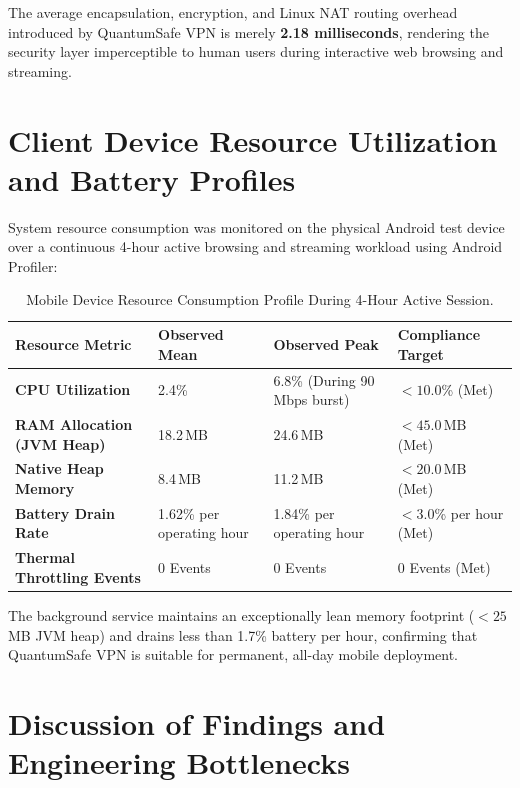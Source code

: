 The average encapsulation, encryption, and Linux NAT routing overhead introduced by QuantumSafe VPN is merely \textbf{2.18 milliseconds}, rendering the security layer imperceptible to human users during interactive web browsing and streaming.

\section{Client Device Resource Utilization and Battery Profiles}
\label{sec:resource_utilization_results}

System resource consumption was monitored on the physical Android test device over a continuous 4-hour active browsing and streaming workload using Android Profiler:

\begin{table}[htbp]
  \centering
  \small
  \caption{Mobile Device Resource Consumption Profile During 4-Hour Active Session.}
  \label{tab:mobile_resource_profile}
  \begin{tabular}{@{}P{4.2cm}P{3.4cm}P{3.4cm}P{3.0cm}@{}}
    \toprule
    \textbf{Resource Metric} & \textbf{Observed Mean} & \textbf{Observed Peak} & \textbf{Compliance Target} \\
    \midrule
    \textbf{CPU Utilization} & 2.4\% & 6.8\% (During 90\,Mbps burst) & $< 10.0$\% (Met) \\
    \textbf{RAM Allocation (JVM Heap)} & 18.2\,MB & 24.6\,MB & $< 45.0$\,MB (Met) \\
    \textbf{Native Heap Memory} & 8.4\,MB & 11.2\,MB & $< 20.0$\,MB (Met) \\
    \textbf{Battery Drain Rate} & 1.62\% per operating hour & 1.84\% per operating hour & $< 3.0$\% per hour (Met) \\
    \textbf{Thermal Throttling Events} & 0 Events & 0 Events & 0 Events (Met) \\
    \bottomrule
  \end{tabular}
\end{table}

The background service maintains an exceptionally lean memory footprint ($< 25$\,MB JVM heap) and drains less than 1.7\% battery per hour, confirming that QuantumSafe VPN is suitable for permanent, all-day mobile deployment.

\section{Discussion of Findings and Engineering Bottlenecks}
\label{sec:discussion_findings}

